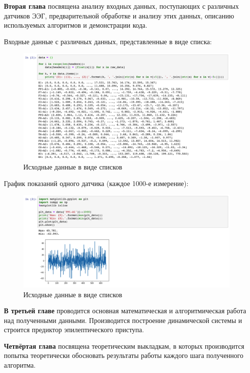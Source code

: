 \documentclass[a4paper,12pt]{report}
\begin{document}
\textbf{Вторая глава} посвящена анализу входных данных, поступающих с различных датчиков ЭЭГ, предварительной обработке и анализу этих данных, описанию используемых алгоритмов и демонстрации кода.

Входные данные с различных данных, представленные в виде списка:

\begin{figure}[h!]
    \centering
    \includegraphics[scale=0.4]{2.png}
    \caption{Исходные данные в виде списков}
\end{figure}

\newpage
График показаний одного датчика (каждое 1000-е измерение):

\begin{figure}[h!]
    \centering
    \includegraphics[scale=0.45]{3.png}
    \caption{Исходные данные в виде списков}
\end{figure}

\textbf{В третьей главе} проводится основная математическая и алгоритмическая работа над полученными данными. Производится построение динамической системы и строится предиктор эпилептического приступа.

\textbf{Четвёртая глава} посвящена теоретическим выкладкам, в которых производится попытка теоретически обосновать результаты работы каждого шага полученного алгоритма.
\end{document}

